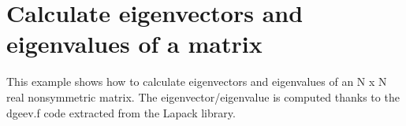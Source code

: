 \documentclass[letterpaper,10pt,english]{sphinxmanual}
\begin{document}
\begin{sphinxVerbatim}[commandchars=\\\{\},numbers=left,firstnumber=1,stepnumber=1]



\end{sphinxVerbatim}


\section{Calculate eigenvectors and eigenvalues of a matrix}
\label{\detokenize{GettingStartedInC:calculate-eigenvectors-and-eigenvalues-of-a-matrix}}
\sphinxAtStartPar
This example shows how to calculate eigenvectors and eigenvalues of an N x N real nonsymmetric matrix.
The eigenvector/eigenvalue is computed thanks to the dgeev.f code extracted from the Lapack library.
\end{document}
